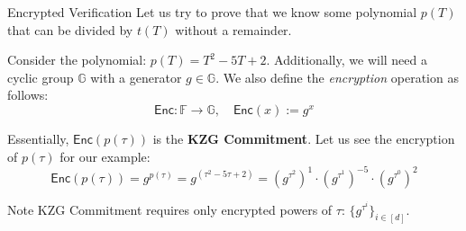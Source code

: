 \documentclass{zkdl-presentation-template}
\begin{document}
    \begin{frame}{Encrypted Verification}
        Let us try to prove that we know some polynomial $p(T)$ that can be divided by $t(T)$ without a
        remainder.
        \pause

        Consider the polynomial: $p(T) = T^2 - 5T + 2$. Additionally, we will need a cyclic group $\mathbb{G}$ with a generator $g \in \mathbb{G}$. We also define the \textit{encryption} operation as follows:
        \begin{equation*}
            \mathsf{Enc}: \mathbb{F} \to \mathbb{G}, \quad \mathsf{Enc}(x) := g^x
        \end{equation*}
        \pause

        Essentially, $\mathsf{Enc}(p(\tau))$ is the \textbf{KZG Commitment}. Let us see the encryption of $p(\tau)$ for our example:
        \begin{equation*}
            \mathsf{Enc}(p(\tau)) = g^{p(\tau)} = g^{\left( \tau^2 - 5\tau + 2 \right)}  = \left( g^{\tau^2} \right)^1 \cdot {\left( g^{\tau^1} \right)}^{-5} \cdot \left(g^{\tau^0}\right)^2
        \end{equation*}
        \pause

        \begin{remarkblock}{Note}
            KZG Commitment requires only encrypted powers of $\tau$: $\{g^{\tau^i}\}_{i \in [d]}$.
        \end{remarkblock}
    \end{frame}
\end{document}
